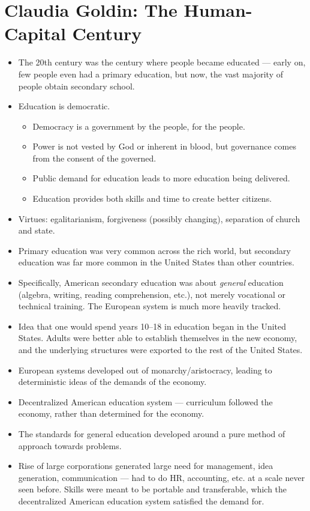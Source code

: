 \documentclass[10pt]{extarticle}
\begin{document}
  \section{Claudia Goldin: The Human-Capital Century}%
  \begin{itemize}
    \item The 20th century was the century where people became educated --- early on, few people even had a primary education, but now, the vast majority of people obtain secondary school.
    \item Education is democratic.
      \begin{itemize}
        \item Democracy is a government by the people, for the people.
        \item Power is not vested by God or inherent in blood, but governance comes from the consent of the governed.
        \item Public demand for education leads to more education being delivered.
        \item Education provides both skills and time to create better citizens.
      \end{itemize}
    \item Virtues: egalitarianism, forgiveness (possibly changing), separation of church and state.
    \item Primary education was very common across the rich world, but secondary education was far more common in the United States than other countries.
    \item Specifically, American secondary education was about \textit{general} education (algebra, writing, reading comprehension, etc.), not merely vocational or technical training. The European system is much more heavily tracked.
    \item Idea that one would spend years 10--18 in education began in the United States. Adults were better able to establish themselves in the new economy, and the underlying structures were exported to the rest of the United States.
    \item European systems developed out of monarchy/aristocracy, leading to deterministic ideas of the demands of the economy.
    \item Decentralized American education system --- curriculum followed the economy, rather than determined for the economy.
    \item The standards for general education developed around a pure method of approach towards problems.
    \item Rise of large corporations generated large need for management, idea generation, communication --- had to do HR, accounting, etc. at a scale never seen before. Skills were meant to be portable and transferable, which the decentralized American education system satisfied the demand for.
  \end{itemize}
\end{document}
